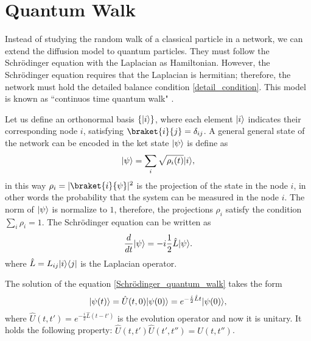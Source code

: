 \section{Quantum Walk}
Instead of studying the random walk of a classical particle in a network, we can extend the diffusion model to quantum particles. 
They must follow the Schrödinger equation with the Laplacian as Hamiltonian. However, the Schrödinger equation requires that the Laplacian is hermitian; therefore, the network must hold the detailed balance condition \eqref{detail_condition}.
This model is known as “continuos time quantum walk" \cite{Farhi_98}.

Let us define an orthonormal basis $\{\lvert i\rangle\}$, where each element $\lvert i\rangle$ indicates their corresponding node $i$, satisfying $\braket{i}{j}=\delta_{ij}$. 
A general general state of the network can be encoded in the ket state $\lvert\psi\rangle$ is define as
\begin{equation}\label{ket_state_quantum}
    \lvert\psi\rangle = \sum_i \sqrt{\rho_i(t)} \lvert i\rangle,
\end{equation}
in this way $\rho_i = |\braket{i}{\psi}|^2$ is the projection of the state in the node $i$, in other words the probability that the system can be measured in the node $i$. The norm of $\lvert\psi\rangle$ is normalize to $1$, therefore, the projections $\rho_i$ satisfy the condition $\sum_i \rho_i = 1$.
The Schrödinger equation can be written as
\begin{equation}\label{Schrödinger_quantum_walk}
    \frac{d}{dt}\lvert\psi\rangle = -i\frac{1}{2}\hat L\lvert\psi\rangle.
\end{equation}
where $\hat L = L_{ij}\lvert i\rangle\langle j\rvert$ is the Laplacian operator.

The solution of the equation \eqref{Schrödinger_quantum_walk} takes the form
\begin{equation}
    \lvert\psi(t)\rangle = \hat U(t,0) \lvert\psi(0)\rangle = e^{-\frac{i}{2}\hat L t} \lvert\psi(0)\rangle,
\end{equation}
where $\hat U(t,t') =e^{-\frac{i}{2}\hat L (t-t')}$ is the evolution operator and now it is unitary. It holds the following property: $\hat U(t,t')\hat U(t',t'') = U(t,t'')$.


